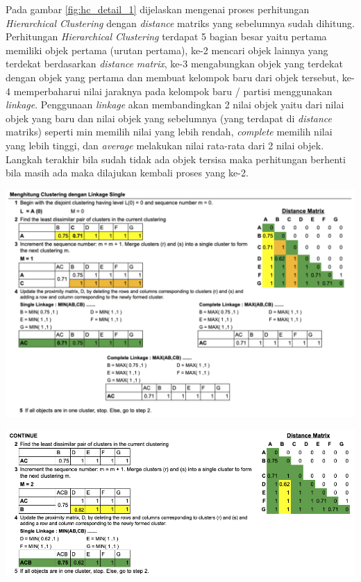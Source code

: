 Pada gambar \ref{fig:hc_detail_1} dijelaskan mengenai proses perhitungan \textit{Hierarchical Clustering} dengan \textit{distance} matriks yang sebelumnya sudah dihitung. Perhitungan \textit{Hierarchical Clustering} terdapat 5 bagian besar yaitu pertama memiliki objek pertama (urutan pertama), ke-2 mencari objek lainnya yang terdekat berdasarkan \textit{distance} \textit{matrix}, ke-3 mengabungkan objek yang terdekat dengan objek yang pertama dan membuat kelompok baru dari objek tersebut, ke-4 memperbaharui nilai jaraknya pada kelompok baru / partisi menggunakan \textit{linkage}. Penggunaan \textit{linkage} akan membandingkan 2 nilai objek yaitu dari nilai objek yang baru dan nilai objek yang sebelumnya (yang terdapat di \textit{distance} matriks) seperti min memilih nilai yang lebih rendah, \textit{complete} memilih nilai yang lebih tinggi, dan \textit{average} melakukan nilai rata-rata dari 2 nilai objek. Langkah terakhir bila sudah tidak ada objek tersisa maka perhitungan berhenti bila masih ada maka dilajukan kembali proses yang ke-2.

\begin{center}
	\includegraphics[width=14cm]{img/bab_3/hc_detail_1.png}
	\label{fig:hc_detail_1}
\end{center}

\begin{center}
	\includegraphics[width=14cm]{img/bab_3/hc_detail_2.png}
	\label{fig:hc_detail_2}
\end{center}

